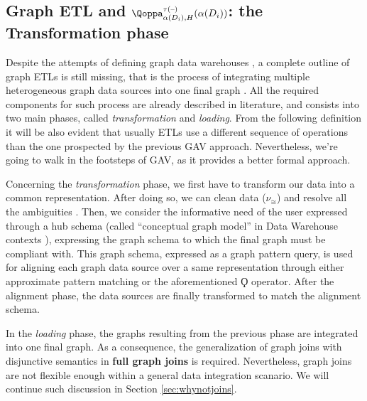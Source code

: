 \subsection{Graph ETL and $\qtransl^{\tau(\textup{--})}_{\abstr(D_i),H}(\abstr(D_i))$: the Transformation phase}\label{sec:ngusecases}

Despite the attempts of defining graph data warehouses \cite{Etcheverry2012a,EtcheverryV12b,
	Zhao11}, a complete outline of graph ETLs is still missing, that is the process of 
integrating multiple heterogeneous graph data sources into one final graph \cite{ChenYZHY08}. 
All the required components for such process are already described in literature, and consists
into two main phases, called \textit{transformation} and \textit{loading}. From the following definition it will be also evident that usually ETLs use a different sequence of operations than the one prospected by the previous GAV approach. Nevertheless, we're going to walk in the footsteps of GAV, as it provides a better formal approach.

Concerning the \textit{transformation} phase, we first have to transform our data into a common representation. After doing so, we can clean data ($\nu_\cong$) and resolve
all the ambiguities \cite{rahm2016case}. Then, we consider the informative need
of the user expressed through a hub schema (called ``conceptual graph model'' in Data Warehouse contexts \cite{jakawat}), expressing the
graph schema to which the final graph must be compliant with. This graph schema, expressed
as a graph pattern query, is used for aligning each graph data source \cite{Aligon201520}
over a same representation through either approximate pattern matching \cite{DeVirgilio2015} or the aforementioned $\Qoppa$ operator. After the alignment phase, the data sources are finally transformed to match the alignment schema. 

In the \textit{loading} phase, the graphs resulting from the previous phase
are integrated into one final graph. 
As a consequence, the generalization of graph joins with
disjunctive semantics in \textbf{full graph joins} is required. Nevertheless, graph joins are not flexible enough within a general data integration scanario. We will continue such discussion in Section \vref{sec:whynotjoins}.

